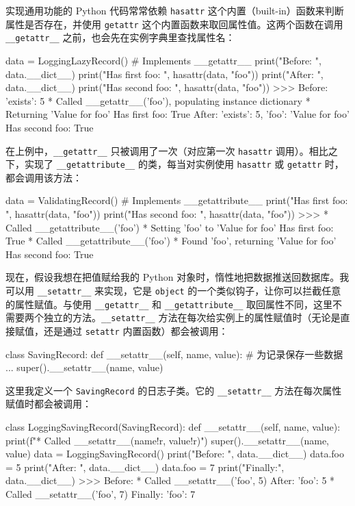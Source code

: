 实现通用功能的 Python 代码常常依赖 \texttt{hasattr} 这个内置（built-in）函数来判断属性是否存在，并使用 \texttt{getattr} 这个内置函数来取回属性值。这两个函数在调用 \texttt{\_\_getattr\_\_} 之前，也会先在实例字典里查找属性名：

\begin{codebox}[python]
data = LoggingLazyRecord()  # Implements __getattr__
print("Before:         ", data.__dict__)
print("Has first foo:  ", hasattr(data, "foo"))
print("After:          ", data.__dict__)
print("Has second foo: ", hasattr(data, "foo"))
>>>
Before:          {'exists': 5}
* Called __getattr__('foo'), populating instance dictionary
* Returning 'Value for foo'
Has first foo:   True
After:           {'exists': 5, 'foo': 'Value for foo'}
Has second foo:  True
\end{codebox}

在上例中，\texttt{\_\_getattr\_\_} 只被调用了一次（对应第一次 \texttt{hasattr} 调用）。相比之下，实现了 \texttt{\_\_getattribute\_\_} 的类，每当对实例使用 \texttt{hasattr} 或 \texttt{getattr} 时，都会调用该方法：

\begin{codebox}[python]
data = ValidatingRecord()  # Implements __getattribute__
print("Has first foo:  ", hasattr(data, "foo"))
print("Has second foo: ", hasattr(data, "foo"))
>>>
* Called __getattribute__('foo')
* Setting 'foo' to 'Value for foo'
Has first foo:   True
* Called __getattribute__('foo')
* Found 'foo', returning 'Value for foo'
Has second foo:  True
\end{codebox}

现在，假设我想在把值赋给我的 Python 对象时，惰性地把数据推送回数据库。我可以用 \texttt{\_\_setattr\_\_} 来实现，它是 \texttt{object} 的一个类似钩子，让你可以拦截任意的属性赋值。与使用 \texttt{\_\_getattr\_\_} 和 \texttt{\_\_getattribute\_\_} 取回属性不同，这里不需要两个独立的方法。\texttt{\_\_setattr\_\_} 方法在每次给实例上的属性赋值时（无论是直接赋值，还是通过 \texttt{setattr} 内置函数）都会被调用：

\begin{codebox}[python]
class SavingRecord:
    def __setattr__(self, name, value):
        # 为记录保存一些数据
        ...
        super().__setattr__(name, value)
\end{codebox}

这里我定义一个 \texttt{SavingRecord} 的日志子类。它的 \texttt{\_\_setattr\_\_} 方法在每次属性赋值时都会被调用：

\begin{codebox}[python]
class LoggingSavingRecord(SavingRecord):
    def __setattr__(self, name, value):
        print(f"* Called __setattr__({name!r}, {value!r})")
        super().__setattr__(name, value)
data = LoggingSavingRecord()
print("Before: ", data.__dict__)
data.foo = 5
print("After:  ", data.__dict__)
data.foo = 7
print("Finally:", data.__dict__)
>>>
Before:  {}
* Called __setattr__('foo', 5)
After:   {'foo': 5}
* Called __setattr__('foo', 7)
Finally: {'foo': 7}
\end{codebox}


